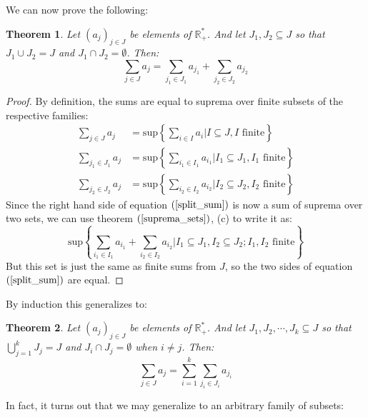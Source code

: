 \documentclass[12pt, a4paper]{article}
\newtheorem{theorem}{Theorem}[section]
\numberwithin{equation}{section}
\begin{document}
We can now prove the following:
\begin{theorem}
Let $(a_j)_{j\in J}$ be elements of $\mathbb{R}_+^*$. And let $J_1,J_2\subseteq J$ so that $J_1\cup J_2=J$ and $J_1\cap J_2=\emptyset$. Then:
\begin{equation}
\label{split_sum}
\sum_{j\in J} a_j = \sum_{j_1\in J_1}a_{j_1} + \sum_{j_2\in J_2}a_{j_2}
\end{equation}
\end{theorem}
\begin{proof}
By definition, the sums are equal to suprema over finite subsets of the respective families:
\begin{align}
\sum_{j\in J} a_j &=\textrm{sup}\left\{\sum_{i\in I}a_i|I\subseteq J, I\textrm{ finite}\right\}\\
\sum_{j_1\in J_1} a_j &=\textrm{sup}\left\{\sum_{i_1\in I_1}a_{i_1}|I_1\subseteq J_1, I_1\textrm{ finite}\right\}\\
\sum_{j_2\in J_2} a_j &=\textrm{sup}\left\{\sum_{i_2\in I_2}a_{i_2}|I_2\subseteq J_2, I_2\textrm{ finite}\right\}
\end{align}
Since the right hand side of equation $(\ref{split_sum})$ is now a sum of suprema over two sets, we can use theorem $(\ref{suprema_sets})$, (c) to write it as:
\begin{equation}
\textrm{sup}\left\{\sum_{i_1\in I_1}a_{i_1}+\sum_{i_2\in I_2}a_{i_2}|I_1\subseteq J_1, I_2\subseteq J_2; I_1, I_2\textrm{ finite}\right\}
\end{equation}
But this set is just the same as finite sums from $J$, so the two sides of equation $(\ref{split_sum})$ are equal.
\end{proof}

By induction this generalizes to:
\begin{theorem}
Let $(a_j)_{j\in J}$ be elements of $\mathbb{R}_+^*$. And let $J_1,J_2,\cdots,J_k\subseteq J$ so that $\bigcup_{j=1}^k J_j=J$ and $J_i\cap J_j=\emptyset$ when $i\neq j$. Then:
\begin{equation}
\sum_{j\in J} a_j = \sum_{i=1}^k\sum_{j_i\in J_i}a_{j_i}
\end{equation}
\end{theorem}

In fact, it turns out that we may generalize to an arbitrary family of subsets:
\end{document}
